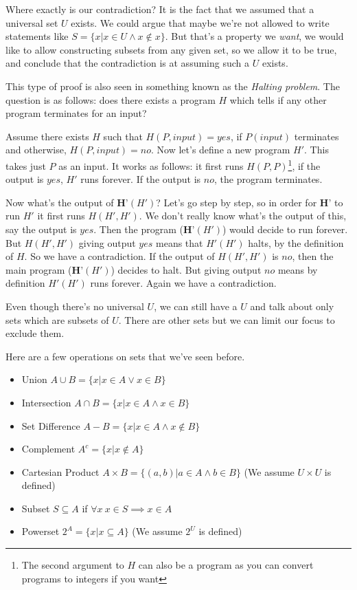 \documentclass[a4paper,10pt]{article}
\theoremstyle{definition} %
\begin{document}
    Where exactly is our contradiction? It is the fact that we assumed that a universal set $U$ 
    exists. We could argue that maybe we're not allowed to write statements like $S = 
    \{x| x \in U \land x \notin x \}$. But that's a property we \emph{want}, we would like to allow
    constructing subsets from any given set, so we allow it to be true, and conclude that the 
    contradiction is at assuming such a $U$ exists.

    This type of proof is also seen in something known as the \emph{Halting problem}.
    The question is as follows: does there exists a program $H$ which tells if any other
    program terminates for an input? 

    Assume there exists $H$ such that $H(P, input) = yes$, if $P(input)$ terminates and otherwise,
    $H(P, input) = no$.
    Now let's define a new program $H'$. This takes just $P$ as an input. It works
    as follows: it first runs $H(P, P)$\footnote{The second argument to $H$ can also
    be a program as you can convert programs to integers if you want}, 
    if the output is $yes$, $H'$ runs forever. If the output is $no$, the program terminates.

    Now what's the output of $\textbf{H'}(H')$? Let's go step by step, so in order for 
    $\textbf{H'}$ to run $H'$ it first runs $H(H',H')$. We don't really know what's the output
    of this, say the output is $yes$. Then the program ($\textbf{H'}(H')$) would decide to run forever. 
    But $H(H',H')$
    giving output $yes$ means that $H'(H')$ halts, by the definition of $H$. So we have a contradiction.
    If the output of $H(H',H')$ is $no$, then the main program ($\textbf{H'}(H')$) 
    decides to halt. But giving output $no$
    means by definition $H'(H')$ runs forever. Again we have a contradiction.

    Even though there's no universal $U$, we can still have a $U$ and talk about only
    sets which are subsets of $U$. There are other sets but we can limit our focus to 
    exclude them.

    Here are a few operations on sets that we've seen before.
    \begin{itemize}
        \item Union $A \cup B = \{x|x \in A \lor x \in B\}$
        \item Intersection $A \cap B = \{x|x \in A \land x \in B\}$
        \item Set Difference $A - B = \{x|x \in A \land x \notin B\}$
        \item Complement $A^c = \{x| x \notin A\}$
        \item Cartesian Product $A \times B = \{(a,b)|a \in A \land b \in B \}$ (We assume $U \times U$ is defined)
        \item Subset $S \subseteq A$ if $\forall x \ x \in S \implies x \in A$ 
        \item Powerset $2^A = \{x|x \subseteq A\}$ (We assume $2^U$ is defined)
    \end{itemize}
\end{document}
